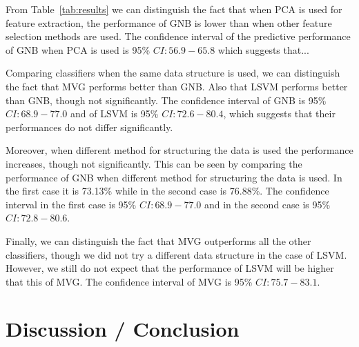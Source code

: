 \documentclass[preprint,journal,11pt]{vgtc}
\begin{document}
From Table~\ref{tab:results} we can distinguish the fact that when PCA is used for feature extraction, the performance of GNB is lower than when other feature selection methods are used. The confidence interval of the predictive performance of GNB when PCA is used is 95\% $CI: 56.9 - 65.8$ which suggests that...

Comparing classifiers when the same data structure is used, we can distinguish the fact that MVG performs better than GNB. Also that LSVM performs better than GNB, though not significantly. The confidence interval of GNB is 95\% $CI: 68.9-77.0$ and of LSVM is 95\% $CI: 72.6-80.4$, which suggests that their performances do not differ significantly.

Moreover, when different method for structuring the data is used the performance increases, though not significantly. This can be seen by comparing the performance of GNB when different method for structuring the data is used. In the first case it is 73.13\% while in the second case is 76.88\%. The confidence interval in the first case is 95\% $CI: 68.9 - 77.0$ and in the second case is 95\% $CI: 72.8 - 80.6$.

Finally, we can distinguish the fact that MVG outperforms all the other classifiers, though we did not try a different data structure in the case of LSVM. However, we still do not expect that the performance of LSVM will be higher that this of MVG. The confidence interval of MVG is 95\% $CI: 75.7-83.1$.

\section{Discussion / Conclusion}
\label{sec:discussion}
\end{document}

